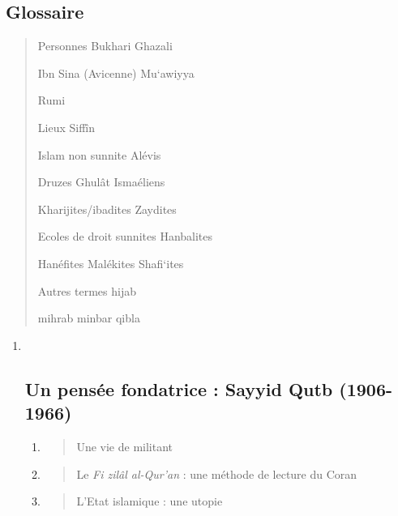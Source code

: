 \hypertarget{glossaire}{%
\subsection{\texorpdfstring{{Glossaire}}{Glossaire}}\label{glossaire}}

\begin{quote}
{Personnes} Bukhari Ghazali

Ibn Sina (Avicenne) Mu`awiyya

Rumi

{Lieux} Siffîn

{Islam non sunnite} Alévis

Druzes Ghulât Ismaéliens

Kharijites/ibadites Zaydites

{Ecoles de droit sunnites} Hanbalites

Hanéfites Malékites Shafi`ites

{Autres termes} hijab

mihrab minbar qibla

 
\end{quote}
 

\begin{enumerate}
\def\labelenumi{\Roman{enumi}.}
\item ~
  \hypertarget{un-pensuxe9e-fondatrice-sayyid-qutb-1906-1966}{%
  \subsection{\texorpdfstring{{Un pensée fondatrice : Sayyid
  Qutb
  (1906-1966)}}{Un pensée fondatrice : Sayyid Qutb (1906-1966)}}\label{un-pensuxe9e-fondatrice-sayyid-qutb-1906-1966}}

  \begin{enumerate}
  \def\labelenumii{\arabic{enumii}.}
  \item
    \begin{quote}
    Une vie de militant
    \end{quote}
  \item
    \begin{quote}
    Le \emph{Fi zilâl al-Qur'an} : une méthode de lecture du Coran
    \end{quote}
  \item
    \begin{quote}
    L'Etat islamique : une utopie
    \end{quote}
  \end{enumerate}
\end{enumerate}

